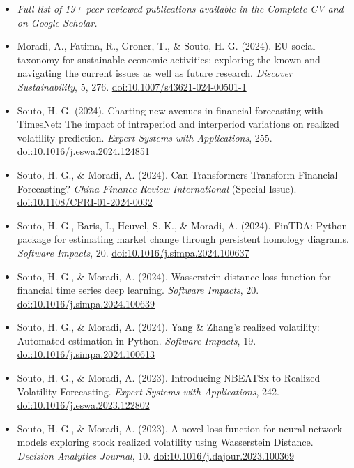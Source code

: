 \documentclass[10pt,a4paper]{article}
\begin{document}
\begin{itemize}
    \ifshortcv
    \item \textit{Full list of 19+ peer-reviewed publications available in the Complete CV and on Google Scholar.}
    \else
    \item Moradi, A., Fatima, R., Groner, T., \& Souto, H. G. (2024). EU social taxonomy for sustainable economic activities: exploring the known and navigating the current issues as well as future research. \textit{Discover Sustainability}, 5, 276. \href{https://doi.org/10.1007/s43621-024-00501-1}{doi:10.1007/s43621-024-00501-1}
    \item Souto, H. G. (2024). Charting new avenues in financial forecasting with TimesNet: The impact of intraperiod and interperiod variations on realized volatility prediction. \textit{Expert Systems with Applications}, 255. \href{https://doi.org/10.1016/j.eswa.2024.124851}{doi:10.1016/j.eswa.2024.124851}
    \item Souto, H. G., \& Moradi, A. (2024). Can Transformers Transform Financial Forecasting? \textit{China Finance Review International} (Special Issue). \href{https://doi.org/10.1108/CFRI-01-2024-0032}{doi:10.1108/CFRI-01-2024-0032}
    \item Souto, H. G., Baris, I., Heuvel, S. K., \& Moradi, A. (2024). FinTDA: Python package for estimating market change through persistent homology diagrams. \textit{Software Impacts}, 20. \href{https://doi.org/10.1016/j.simpa.2024.100637}{doi:10.1016/j.simpa.2024.100637}
    \item Souto, H. G., \& Moradi, A. (2024). Wasserstein distance loss function for financial time series deep learning. \textit{Software Impacts}, 20. \href{https://doi.org/10.1016/j.simpa.2024.100639}{doi:10.1016/j.simpa.2024.100639}
    \item Souto, H. G., \& Moradi, A. (2024). Yang \& Zhang's realized volatility: Automated estimation in Python. \textit{Software Impacts}, 19. \href{https://doi.org/10.1016/j.simpa.2024.100613}{doi:10.1016/j.simpa.2024.100613}
    \item Souto, H. G., \& Moradi, A. (2023). Introducing NBEATSx to Realized Volatility Forecasting. \textit{Expert Systems with Applications}, 242. \href{https://doi.org/10.1016/j.eswa.2023.122802}{doi:10.1016/j.eswa.2023.122802}
    \item Souto, H. G., \& Moradi, A. (2023). A novel loss function for neural network models exploring stock realized volatility using Wasserstein Distance. \textit{Decision Analytics Journal}, 10. \href{https://doi.org/10.1016/j.dajour.2023.100369}{doi:10.1016/j.dajour.2023.100369}

\end{itemize}
\end{document}
